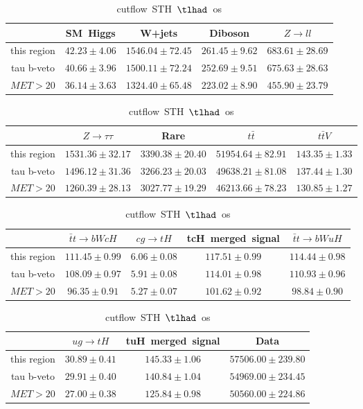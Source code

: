\begin{table}
\footnotesize
\caption{cutflow~STH~$\tlhad$~os}
\centering
\begin{tabular}{|c|c|c|c|c|} \hline
 & SM~Higgs & W+jets & Diboson & $Z\to ll$\\\hline
this region & $42.23\pm4.06$ & $1546.04\pm72.45$ & $261.45\pm9.62$ & $683.61\pm28.69$\\\hline
tau b-veto & $40.66\pm3.96$ & $1500.11\pm72.24$ & $252.69\pm9.51$ & $675.63\pm28.63$\\\hline
$MET>20$ & $36.14\pm3.63$ & $1324.40\pm65.48$ & $223.02\pm8.90$ & $455.90\pm23.79$\\\hline
\end{tabular}
\begin{tabular}{|c|c|c|c|c|} \hline
 & $Z\to \tau\tau$ & Rare & $t\bar{t}$ & $t\bar{t}V$\\\hline
this region & $1531.36\pm32.17$ & $3390.38\pm20.40$ & $51954.64\pm82.91$ & $143.35\pm1.33$\\\hline
tau b-veto & $1496.12\pm31.36$ & $3266.23\pm20.03$ & $49638.21\pm81.08$ & $137.44\pm1.30$\\\hline
$MET>20$ & $1260.39\pm28.13$ & $3027.77\pm19.29$ & $46213.66\pm78.23$ & $130.85\pm1.27$\\\hline
\end{tabular}
\begin{tabular}{|c|c|c|c|c|} \hline
 & $\bar{t}t\to bWcH$ & $cg\to tH$ & tcH~merged~signal & $\bar{t}t\to bWuH$\\\hline
this region & $111.45\pm0.99$ & $6.06\pm0.08$ & $117.51\pm0.99$ & $114.44\pm0.98$\\\hline
tau b-veto & $108.09\pm0.97$ & $5.91\pm0.08$ & $114.01\pm0.98$ & $110.93\pm0.96$\\\hline
$MET>20$ & $96.35\pm0.91$ & $5.27\pm0.07$ & $101.62\pm0.92$ & $98.84\pm0.90$\\\hline
\end{tabular}
\begin{tabular}{|c|c|c|c|} \hline
 & $ug\to tH$ & tuH~merged~signal & Data\\\hline
this region & $30.89\pm0.41$ & $145.33\pm1.06$ & $57506.00\pm239.80$\\\hline
tau b-veto & $29.91\pm0.40$ & $140.84\pm1.04$ & $54969.00\pm234.45$\\\hline
$MET>20$ & $27.00\pm0.38$ & $125.84\pm0.98$ & $50560.00\pm224.86$\\\hline
\end{tabular}
\label{tab:cutflow_reg1l1tau1b2j_os}
\end{table}
